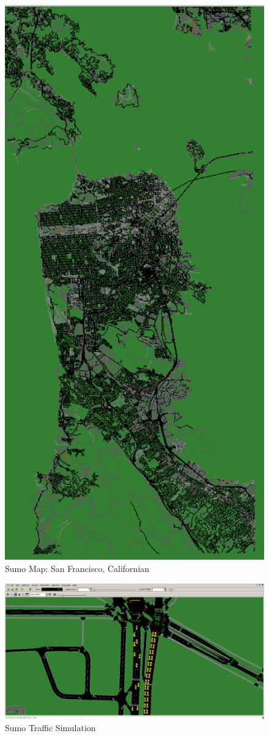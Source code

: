 \begin{figure}[h]
    \centering
    \includegraphics[width=0.40\linewidth]{data/ffss/sumo2.png}
    \caption{Sumo Map: San Francisco, Californian}
    \label{fig:Sumo2}
\end{figure}

\begin{figure}[h]
    \centering
    \includegraphics[width=0.90\linewidth]{data/ffss/sumo1.png}
    \caption{Sumo Traffic Simulation}
    \label{fig:Sumo1}
\end{figure}





